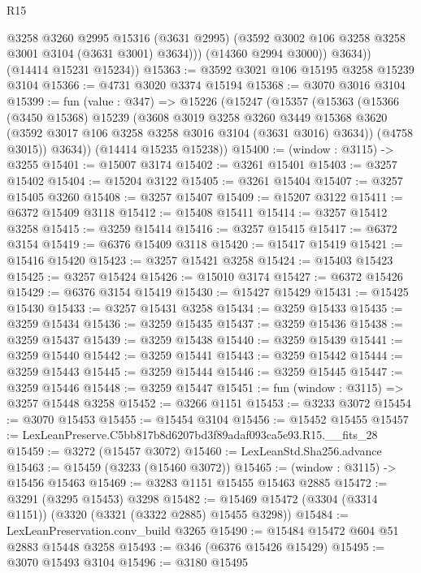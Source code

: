 \begin{lexlean}{R15}
\begin{coremodule}
                @3258
                @3260
                @2995
                @15316
                (@3631 @2995)
                (@3592 @3002 @106 @3258 @3258 @3001 @3104 (@3631 @3001) @3634)))
            (@14360 @2994 @3000))
          @3634))
      (@14414 @15231 @15234))
@15363 := @3592 @3021 @106 @15195 @3258 @15239 @3104
@15366 := @4731 @3020 @3374 @15194
@15368 := @3070 @3016 @3104
@15399 := fun (value : @347) =>
  @15226
    (@15247
      (@15357
        (@15363
          (@15366
            (@3450 @15368)
            @15239
            (@3608
              @3019
              @3258
              @3260
              @3449
              @15368
              @3620
              (@3592 @3017 @106 @3258 @3258 @3016 @3104 (@3631 @3016) @3634))
            (@4758 @3015))
          @3634))
      (@14414 @15235 @15238))
@15400 := (window : @3115) -> @3255
@15401 := @15007 @3174
@15402 := @3261 @15401
@15403 := @3257 @15402
@15404 := @15204 @3122
@15405 := @3261 @15404
@15407 := @3257 @15405 @3260
@15408 := @3257 @15407
@15409 := @15207 @3122
@15411 := @6372 @15409 @3118
@15412 := @15408 @15411
@15414 := @3257 @15412 @3258
@15415 := @3259 @15414
@15416 := @3257 @15415
@15417 := @6372 @3154
@15419 := @6376 @15409 @3118
@15420 := @15417 @15419
@15421 := @15416 @15420
@15423 := @3257 @15421 @3258
@15424 := @15403 @15423
@15425 := @3257 @15424
@15426 := @15010 @3174
@15427 := @6372 @15426
@15429 := @6376 @3154 @15419
@15430 := @15427 @15429
@15431 := @15425 @15430
@15433 := @3257 @15431 @3258
@15434 := @3259 @15433
@15435 := @3259 @15434
@15436 := @3259 @15435
@15437 := @3259 @15436
@15438 := @3259 @15437
@15439 := @3259 @15438
@15440 := @3259 @15439
@15441 := @3259 @15440
@15442 := @3259 @15441
@15443 := @3259 @15442
@15444 := @3259 @15443
@15445 := @3259 @15444
@15446 := @3259 @15445
@15447 := @3259 @15446
@15448 := @3259 @15447
@15451 := fun (window : @3115) => @3257 @15448 @3258
@15452 := @3266 @1151
@15453 := @3233 @3072
@15454 := @3070 @15453
@15455 := @15454 @3104
@15456 := @15452 @15455
@15457 := LexLeanPreserve.C5bb817b8d6207bd3f89adaf093ca5e93.R15.__fits_28
@15459 := @3272 (@15457 @3072)
@15460 := LexLeanStd.Sha256.advance
@15463 := @15459 (@3233 (@15460 @3072))
@15465 := (window : @3115) -> @15456 @15463
@15469 := @3283 @1151 @15455 @15463 @2885
@15472 := @3291 (@3295 @15453) @3298
@15482 := @15469 @15472 (@3304 (@3314 @1151)) (@3320 (@3321 (@3322 @2885) @15455 @3298))
@15484 := LexLeanPreservation.conv_build @3265
@15490 := @15484 @15472 @604 @51 @2883 @15448 @3258
@15493 := @346 (@6376 @15426 @15429)
@15495 := @3070 @15493 @3104
@15496 := @3180 @15495

\end{coremodule}
\end{lexlean}
